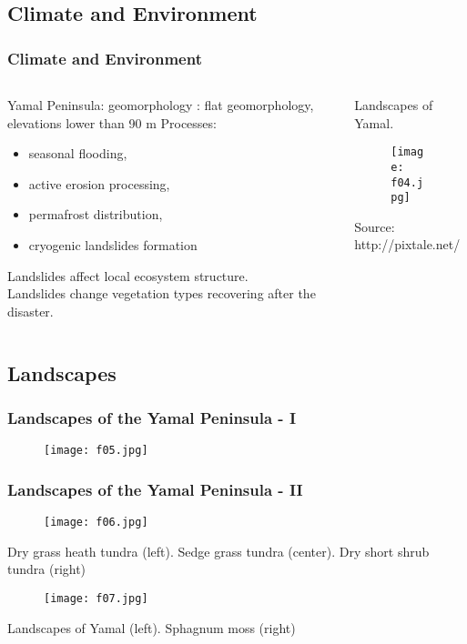 \documentclass[pdflatex,compress,8pt,
	xcolor={dvipsnames,dvipsnames,svgnames,x11names,table},
	hyperref={colorlinks = true,breaklinks = true, urlcolor = NavyBlue, breaklinks = true}]{beamer}
\begin{document}
\subsection{Climate and Environment}
\begin{frame}\frametitle{Climate and Environment}
\begin{minipage}[0.4\textheight]{\textwidth}
\begin{columns}[T]
\begin{column}{0.5\textwidth}
Yamal Peninsula: geomorphology : flat geomorphology, elevations lower than 90 m
Processes:
 \begin{itemize}
        	\item seasonal flooding,
	\item active erosion processing,
	\item permafrost distribution,
	\item cryogenic landslides formation
\end{itemize}
Landslides affect local ecosystem structure. \\
Landslides change vegetation types recovering after the disaster.
\end{column}
\begin{column}{0.5\textwidth}
Landscapes of Yamal. 
\begin{figure}[H]
	\centering
		\texttt{[image: f04.jpg]}
\end{figure}
Source: http://pixtale.net/
\end{column}
\end{columns}
\end{minipage}
\end{frame}

\subsection{Landscapes}
\begin{frame}\frametitle{Landscapes of the Yamal Peninsula - I}
\begin{figure}[H]
	\centering
		\texttt{[image: f05.jpg]}
\end{figure}
\end{frame}

\begin{frame}\frametitle{Landscapes of the Yamal Peninsula - II}
\begin{figure}[H]
	\centering
		\texttt{[image: f06.jpg]}
\end{figure}
Dry grass heath tundra (left). Sedge grass tundra (center). Dry short shrub tundra (right)
\begin{figure}[H]
	\centering
		\texttt{[image: f07.jpg]}
\end{figure}
Landscapes of Yamal (left). Sphagnum moss (right)
\end{frame}
\end{document}
